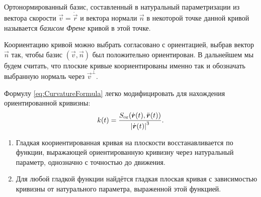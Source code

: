 \begin{definition}
	Ортонормированный базис, составленный в натуральный параметризации из вектора скорости $\vec{v} = \dot{\vec{r}}$ и вектора нормали $\vec{n}$ в некоторой точке данной кривой называется \textit{базисом Френе} кривой в этой точке.
\end{definition}

Коориентацию кривой можно выбрать согласовано с ориентацией, выбрав вектор $\vec{n}$ так, чтобы базис $(\vec{v}, \vec{n})$ был положительно ориентирован. В дальнейшем мы будем считать, что плоские кривые коориентированы именно так и обозначать выбранную нормаль через $\vec{v}^{\perp}$.

Формулу \eqref{eq:CurvatureFormula} легко модифицировать для нахождения ориентированной кривизны:
\begin{equation} \label{eq:OrientedCurvature}
	k(t) = \frac{S_{\mathrm{or}}(\dot{\boldsymbol{r}}(t), \ddot{\boldsymbol{r}}(t))}{\left\lvert\dot{\boldsymbol{r}}(t)\right\rvert^3}.
\end{equation}

\begin{theorem} \label{theorem:FundamentalPlaneCurves}
	\begin{enumerate}[nolistsep, label=(\arabic*)]
		\item Гладкая коориентированная кривая на плоскости восстанавливается по функции, выражающей ориентированную кривизну через натуральный параметр, однозначно с точностью до движения.
		\item Для любой гладкой функции найдётся гладкая плоская кривая с зависимостью кривизны от натурального параметра, выраженной этой функцией.
	\end{enumerate}
\end{theorem}

